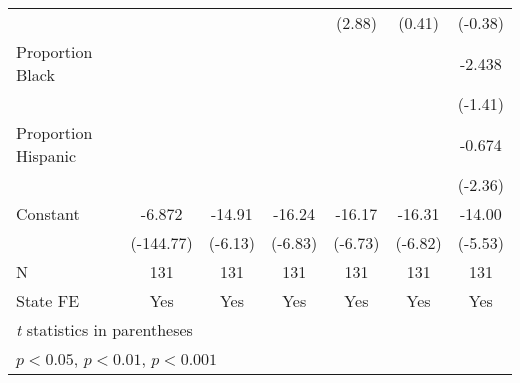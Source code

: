 {\begin{tabular}{l*{6}{c}}
                    &                     &                     &                     &      (2.88)         &      (0.41)         &     (-0.38)         \\
\addlinespace
Proportion Black    &                     &                     &                     &                     &                     &      -2.438         \\
                    &                     &                     &                     &                     &                     &     (-1.41)         \\
\addlinespace
Proportion Hispanic &                     &                     &                     &                     &                     &      -0.674\sym{*}  \\
                    &                     &                     &                     &                     &                     &     (-2.36)         \\
\addlinespace
Constant            &      -6.872\sym{***}&      -14.91\sym{***}&      -16.24\sym{***}&      -16.17\sym{***}&      -16.31\sym{***}&      -14.00\sym{***}\\
                    &   (-144.77)         &     (-6.13)         &     (-6.83)         &     (-6.73)         &     (-6.82)         &     (-5.53)         \\
\midrule
N                   &         131         &         131         &         131         &         131         &         131         &         131         \\
State FE            &         Yes         &         Yes         &         Yes         &         Yes         &         Yes         &         Yes         \\
\bottomrule
\multicolumn{7}{l}{\footnotesize \textit{t} statistics in parentheses}\\
\multicolumn{7}{l}{\footnotesize \sym{*} \(p<0.05\), \sym{**} \(p<0.01\), \sym{***} \(p<0.001\)}\\
\end{tabular}
}
